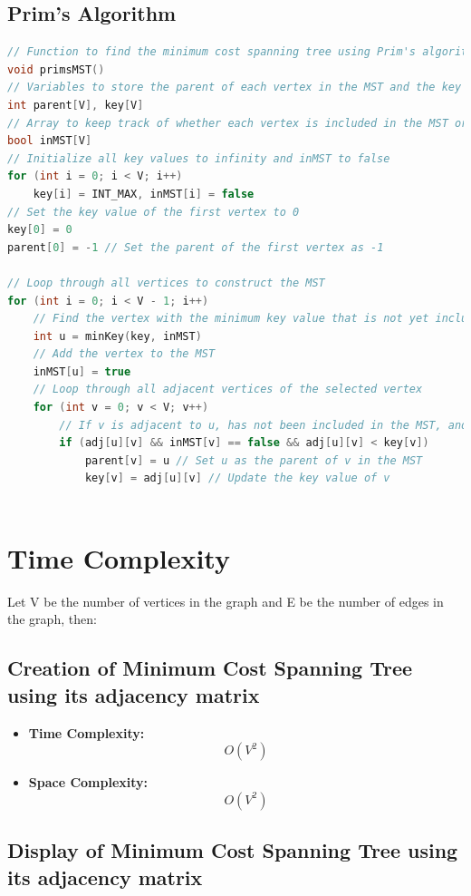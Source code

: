 \documentclass[11pt]{article}
\begin{document}
\subsection{Prim's Algorithm}
\begin{lstlisting}[language=C++]
// Function to find the minimum cost spanning tree using Prim's algorithm
void primsMST()
// Variables to store the parent of each vertex in the MST and the key value of each vertex
int parent[V], key[V]
// Array to keep track of whether each vertex is included in the MST or not
bool inMST[V]
// Initialize all key values to infinity and inMST to false
for (int i = 0; i < V; i++)
    key[i] = INT_MAX, inMST[i] = false
// Set the key value of the first vertex to 0
key[0] = 0
parent[0] = -1 // Set the parent of the first vertex as -1

// Loop through all vertices to construct the MST
for (int i = 0; i < V - 1; i++)
    // Find the vertex with the minimum key value that is not yet included in the MST
    int u = minKey(key, inMST)
    // Add the vertex to the MST
    inMST[u] = true
    // Loop through all adjacent vertices of the selected vertex
    for (int v = 0; v < V; v++)
        // If v is adjacent to u, has not been included in the MST, and has a smaller key value than its current value
        if (adj[u][v] && inMST[v] == false && adj[u][v] < key[v])
            parent[v] = u // Set u as the parent of v in the MST
            key[v] = adj[u][v] // Update the key value of v
    
\end{lstlisting}

\section{Time Complexity}
Let V be the number of vertices in the graph and E be the number of edges in the graph, then:


\subsection{Creation of Minimum Cost Spanning Tree using its adjacency matrix}
\begin{itemize}
    \item \textbf{Time Complexity:} \[O(V^2)\]
    \item \textbf{Space Complexity:} \[O(V^2)\]
\end{itemize}

\subsection{Display of Minimum Cost Spanning Tree using its adjacency matrix}
\end{document}
